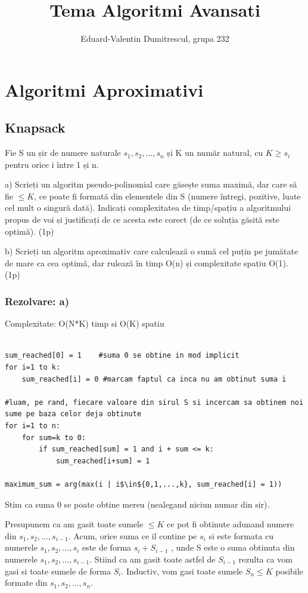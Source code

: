 \documentclass[a4paper]{article}
\title{Tema Algoritmi Avansati}
\author{Eduard-Valentin Dumitrescul, grupa 232}
\begin{document}
\maketitle
\section{Algoritmi Aproximativi}
\subsection{Knapsack}
Fie S un șir de numere naturale ${s_{1}, s_{2}, ... , s_{n} }$ și K un număr natural, cu $K \geq s_{i}$ pentru orice i între 1 și n.

a) Scrieți un algoritm pseudo-polinomial care găsește suma maximă,
dar care să fie $\leq K$, ce poate fi formată din elementele din S (numere
întregi, pozitive, luate cel mult o singură dată). Indicați complexitatea de timp/spațiu a algoritmului propus de voi și justificați de ce
acesta este corect (de ce soluția găsită este optimă). \hfill(1p)

b) Scrieți un algoritm aproximativ care calculează o sumă cel puțin pe
jumătate de mare ca cea optimă, dar rulează în timp O(n) și complexitate spațiu O(1). \hfill(1p)

\subsubsection*{Rezolvare: a)}


Complexitate: O(N*K) timp si O(K) spatiu
\begin{lstlisting}[tabsize=2]

sum_reached[0] = 1    #suma 0 se obtine in mod implicit
for i=1 to k:
	sum_reached[i] = 0 #marcam faptul ca inca nu am obtinut suma i

#luam, pe rand, fiecare valoare din sirul S si incercam sa obtinem noi sume pe baza celor deja obtinute
for i=1 to n: 
	for sum=k to 0:
		if sum_reached[sum] = 1 and i + sum <= k:
			sum_reached[i+sum] = 1
			
maximum_sum = arg(max(i | i$\in${0,1,...,k}, sum_reached[i] = 1))

\end{lstlisting}

Stim ca suma 0 se poate obtine mereu (nealegand niciun numar din sir).

Presupunem ca am gasit toate sumele $\leq K$ ce pot fi obtinute adunand numere din ${s_{1}, s_{2}, ... , s_{i-1} }$. Acum, orice suma ce il contine pe $s_{i}$ si este formata cu numerele ${s_{1}, s_{2}, ... , s_{i} }$ este de forma $s_{i} + S_{i-1}$ , unde S este o suma obtinuta din numerele ${s_{1}, s_{2}, ... , s_{i-1} }$. Stiind ca am gasit toate astfel de $S_{i-1}$ rezulta ca vom gasi si toate sumele de forma $S_{i}$.
Inductiv, vom gasi toate sumele $S_{n} \leq K$ posibile formate din ${s_{1},s_{2},...,s_{n} }$.
\end{document}
